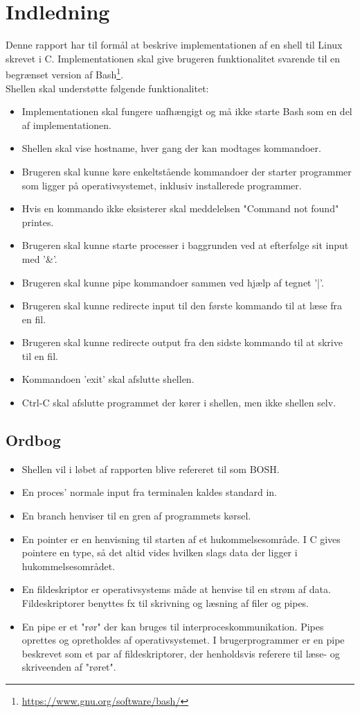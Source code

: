 \section{Indledning}
Denne rapport har til formål at beskrive implementationen af en shell til Linux skrevet i C. Implementationen skal give brugeren funktionalitet svarende til en begrænset version af Bash\footnote{\url{https://www.gnu.org/software/bash/}}. \\

Shellen skal understøtte følgende funktionalitet:
\begin{itemize}
	\item Implementationen skal fungere uafhængigt og må ikke starte Bash som en del af implementationen.
	\item Shellen skal vise hostname, hver gang der kan modtages kommandoer.
	\item Brugeren skal kunne køre enkeltstående kommandoer der starter programmer som ligger på operativsystemet, inklusiv installerede programmer.
	\item Hvis en kommando ikke eksisterer skal meddelelsen "Command not found" printes.
	\item Brugeren skal kunne starte processer i baggrunden ved at efterfølge sit input med '\&'.
	\item Brugeren skal kunne pipe kommandoer sammen ved hjælp af tegnet '|'.
	\item Brugeren skal kunne redirecte input til den første kommando til at læse fra en fil.
	\item Brugeren skal kunne redirecte output fra den sidste kommando til at skrive til en fil.
	\item Kommandoen 'exit' skal afslutte shellen.
	\item Ctrl-C skal afslutte programmet der kører i shellen, men ikke shellen selv.
\end{itemize}

\subsection{Ordbog}
\begin{itemize}
	\item Shellen vil i løbet af rapporten blive refereret til som BOSH.
	\item En proces' normale input fra terminalen kaldes standard in.
	\item En branch henviser til en gren af programmets kørsel.
	\item En pointer er en henvisning til starten af et hukommelsesområde. I C gives pointere en type, så det altid vides hvilken slags data der ligger i hukommelsesområdet.
	\item En fildeskriptor er operativsystems måde at henvise til en strøm af data. Fildeskriptorer benyttes fx til skrivning og læsning af filer og pipes.
	\item En pipe er et "rør" der kan bruges til interproceskommunikation. Pipes oprettes og opretholdes af operativsystemet. I brugerprogrammer er en pipe beskrevet som et par af fildeskriptorer, der henholdsvis referere til læse- og skriveenden af "røret".

\end{itemize}


